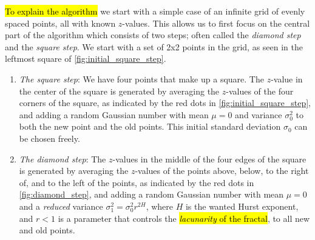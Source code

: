 \hl{To explain the algorithm} we start with a simple case of an infinite grid of evenly spaced points, all with known $z$-values. This allows us to first focus on the central part of the algorithm which consists of two steps; often called the \emph{diamond step} and the \emph{square step}. We start with a set of 2x2 points in the grid, as seen in the leftmost square of \cref{fig:initial_square_step}.
\begin{enumerate}
    \item \emph{The square step}: We have four points that make up a square. The $z$-value in the center of the square is generated by averaging the $z$-values of the four corners of the square, as indicated by the red dots in \cref{fig:initial_square_step}, and adding a random Gaussian number with mean $\mu = 0$ and variance $\sigma_0^2$ to both the new point and the old points. This initial standard deviation $\sigma_0$ can be chosen freely.
    \label{enum:test}
    
    \item \emph{The diamond step}: The $z$-values in the middle of the four edges of the square is generated by averaging the $z$-values of the points above, below, to the right of, and to the left of the points, as indicated by the red dots in \cref{fig:diamond_step}, and adding a random Gaussian number with mean $\mu = 0$ and a \emph{reduced} variance $\sigma_1^2 = \sigma_0^2r^{2H}$, where $H$ is the wanted Hurst exponent, and $r < 1$ is a parameter that controls the \hl{\emph{lacunarity} of the fractal}, to all new and old points.
    
%     
    
    

\end{enumerate}
